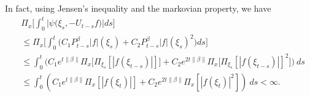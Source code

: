 \documentclass[12pt]{amsart}
\theoremstyle{plain}
\theoremstyle{definition}
\numberwithin{equation}{section}
\begin{document}
    In fact, using Jensen's inequality and the markovian property, we have 
\begin{align}
\label{eq: domination of psi(v)}
    &\Pi_x\Big[\int_0^t \big|\psi \big(\xi_s,-U_{t-s}f\big)\big|ds\Big]
    \\&\leq \Pi_x\Big[\int_0^t \big(C_1 P_{t-s}^\beta|f|(\xi_s)+C_2 P_{t-s}^\beta|f|(\xi_s)^2\big)ds\Big]
    \\ &\leq \int_0^t \big(C_1 e^{t\|\beta\|}\Pi_x \big[ \Pi_{\xi_s}[|f(\xi_{t-s})|] \big]+C_2 e^{2t\|\beta\|}\Pi_x \big[ \Pi_{\xi_s}[|f (\xi_{t-s})|]^2 \big]\big)~ds
    \\ &\leq \int_0^t (C_1 e^{t\|\beta\|}\Pi_x [ |f(\xi_{t})|]+C_2e^{2t\|\beta\|}\Pi_x [ |f (\xi_{t})|^2 ])~ds < \infty.
\end{align}
\end{document}
